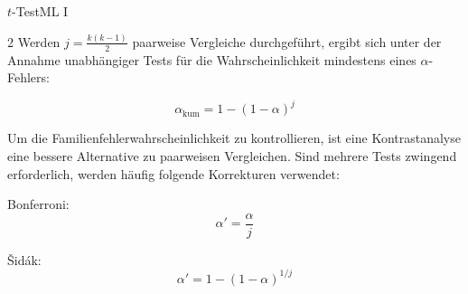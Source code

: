 \begin{formulaBox}{\texorpdfstring{$t$-Test}{t-Test}}{ML I}
\begin{multicols}{2}
Werden $j=\frac{k(k-1)}{2}$ paarweise Vergleiche durchgeführt, ergibt sich unter der Annahme unabhängiger Tests für die Wahrscheinlichkeit mindestens eines $\alpha$-Fehlers:

$$
\alpha_{\mathrm{kum}}
=1-(1-\alpha)^j
$$

Um die Familienfehlerwahrscheinlichkeit zu kontrollieren, ist eine Kontrastanalyse eine bessere Alternative zu paarweisen Vergleichen. Sind mehrere Tests zwingend erforderlich, werden häufig folgende Korrekturen verwendet:

\vspace{0.5em}
Bonferroni:
$$
\alpha'=\frac{\alpha}{j}
$$

Šidák:
$$
\alpha'=1-(1-\alpha)^{1/j}
$$

\end{multicols}
\end{formulaBox}
